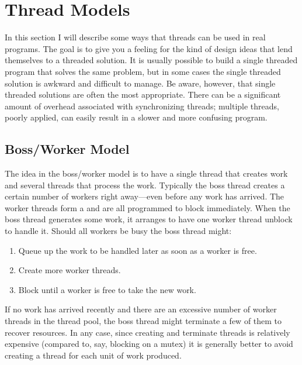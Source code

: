 
\section{Thread Models}
\label{sec:thread-models}

In this section I will describe some ways that threads can be used in real programs. The goal is
to give you a feeling for the kind of design ideas that lend themselves to a threaded solution.
It is usually possible to build a single threaded program that solves the same problem, but in
some cases the single threaded solution is awkward and difficult to manage. Be aware, however,
that single threaded solutions are often the most appropriate. There can be a significant amount
of overhead associated with synchronizing threads; multiple threads, poorly applied, can easily
result in a slower and more confusing program.

\subsection{Boss/Worker Model}
\label{subsec:bossworker-model}

The idea in the boss/worker model is to have a single  thread that creates work
and several  threads that process the work. Typically the boss thread creates a
certain number of workers right away---even before any work has arrived. The worker threads form
a  and are all programmed to block immediately. When the boss thread
generates some work, it arranges to have one worker thread unblock to handle it. Should all
workers be busy the boss thread might:

\begin{enumerate}
  
\item Queue up the work to be handled later as soon as a worker is free.

\item Create more worker threads.

\item Block until a worker is free to take the new work.

\end{enumerate}

If no work has arrived recently and there are an excessive number of worker threads in the
thread pool, the boss thread might terminate a few of them to recover resources. In any case,
since creating and terminate threads is relatively expensive (compared to, say, blocking on a
mutex) it is generally better to avoid creating a thread for each unit of work produced.

